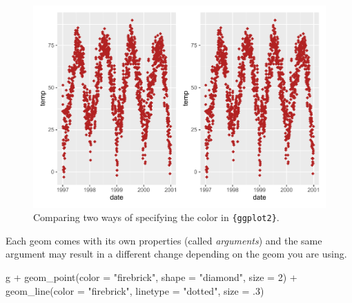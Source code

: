 \documentclass[
]{krantz}
\makeatletter
\newenvironment{Shaded}{\begin{snugshade}}{\end{snugshade}}
\newcommand{\AttributeTok}[1]{\textcolor[rgb]{0.61,0.61,0.61}{#1}}
\newcommand{\DecValTok}[1]{\textcolor[rgb]{0.06,0.06,0.06}{#1}}
\newcommand{\FunctionTok}[1]{\textcolor[rgb]{0,0,0}{#1}}
\newcommand{\NormalTok}[1]{#1}
\newcommand{\SpecialCharTok}[1]{\textcolor[rgb]{0,0,0}{#1}}
\newcommand{\StringTok}[1]{\textcolor[rgb]{0.5,0.5,0.5}{#1}}
\newenvironment{kframe}{%
\medskip{}
\setlength{\fboxsep}{.8em}
 \def\at@end@of@kframe{}%
 \ifinner\ifhmode%
  \def\at@end@of@kframe{\end{minipage}}%
  \begin{minipage}{\columnwidth}%
 \fi\fi%
 \def\FrameCommand##1{\hskip\@totalleftmargin \hskip-\fboxsep
 \colorbox{shadecolor}{##1}\hskip-\fboxsep
     \hskip-\linewidth \hskip-\@totalleftmargin \hskip\columnwidth}%
 \MakeFramed {\advance\hsize-\width
   \@totalleftmargin\z@ \linewidth\hsize
   \@setminipage}}%
 {\par\unskip\endMakeFramed%
 \at@end@of@kframe}
\renewenvironment{Shaded}{\begin{kframe}}{\end{kframe}}
\makeatother
\begin{document}
\begin{figure}
\centering
\includegraphics{bookdown_files/figure-latex/ggplot-default-col-size-hex-rgb-plot-1.pdf}
\caption{\label{fig:ggplot-default-col-size-hex-rgb-plot}Comparing two ways of specifying the color in \texttt{\{ggplot2\}}.}
\end{figure}

Each geom comes with its own properties (called \emph{arguments}) and the same argument may result in a different change depending on the geom you are using.

\begin{Shaded}
\begin{Highlighting}[]
\NormalTok{g }\SpecialCharTok{+} \FunctionTok{geom\_point}\NormalTok{(}\AttributeTok{color =} \StringTok{"firebrick"}\NormalTok{, }\AttributeTok{shape =} \StringTok{"diamond"}\NormalTok{, }\AttributeTok{size =} \DecValTok{2}\NormalTok{) }\SpecialCharTok{+}
    \FunctionTok{geom\_line}\NormalTok{(}\AttributeTok{color =} \StringTok{"firebrick"}\NormalTok{, }\AttributeTok{linetype =} \StringTok{"dotted"}\NormalTok{, }\AttributeTok{size =}\NormalTok{ .}\DecValTok{3}\NormalTok{)}
\end{Highlighting}
\end{Shaded}
\end{document}
